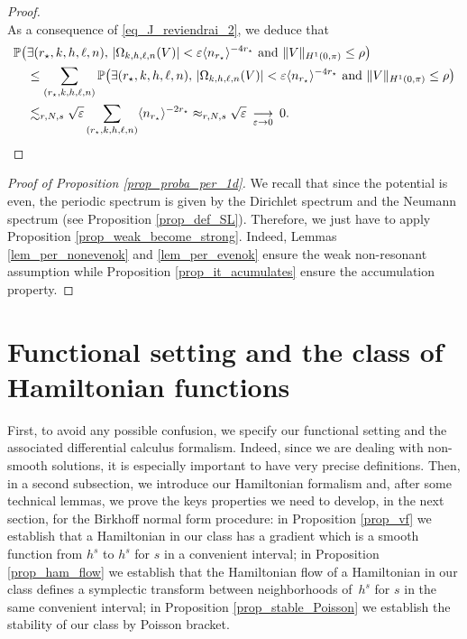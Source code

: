\documentclass[JEP,XML,SOM,Unicode,NoEqCountersInSection,published]{cedram}
\theoremstyle{definition}
\begin{document}
\begin{proof}
\[\]
As a consequence of \eqref{eq_J_reviendrai_2}, we deduce that
\begin{align*}
\mathbb{P}\big(&\exists (r_\star,k,h,\ell,n), \, |\Omega_{k,h,\ell,n}(V)| < \varepsilon \langle n_{r_\star} \rangle^{-4 r_\star} \ \text{and} \ \| V\|_{H^1(0,\pi)} \leq \rho \big) \\ & \leq \sum_{ (r_\star,k,h,\ell,n)} \mathbb{P}\big(\exists (r_\star,k,h,\ell,n), \, |\Omega_{k,h,\ell,n}(V)| < \varepsilon \langle n_{r_\star} \rangle^{-4 r_\star} \ \text{and} \ \| V\|_{H^1(0,\pi)} \leq \rho \big) \\
& \lesssim_{r,N,s} \sqrt{\varepsilon} \sum_{ (r_\star,k,h,\ell,n)} \langle n_{r_\star} \rangle^{-2 r_\star} \approx_{r,N,s} \sqrt{\varepsilon} \ \mathop{\longrightarrow}_{\varepsilon \to 0} \ 0.\qedhere
\end{align*}
\end{proof}

\begin{proof}[Proof of Proposition \ref{prop_proba_per_1d}] We recall that since the potential is even, the periodic spectrum is given by the Dirichlet spectrum and the Neumann spectrum (see Proposition \ref{prop_def_SL}). Therefore, we just have to apply Proposition \ref{prop_weak_become_strong}. Indeed, Lemmas \ref{lem_per_nonevenok} and \ref{lem_per_evenok} ensure the weak non-resonant assumption while Proposition \ref{prop_it_acumulates} ensure the accumulation property.
\end{proof}

\section{Functional setting and the class of Hamiltonian functions}
\label{sec_class_Ham}

First, to avoid any possible confusion, we specify our functional setting and the asso\-ciated differential calculus formalism. Indeed, since we are dealing with non-smooth solutions, it is especially important to have very precise definitions. Then, in a second subsection, we introduce our Hamiltonian formalism and, after some technical lemmas, we prove the keys properties we need to develop, in the next section, for the Birkhoff normal form procedure: in Proposition \ref{prop_vf} we establish that a Hamiltonian in our class has a gradient which is a smooth function from $h^s$ to $h^s$ for $s$ in a convenient interval; in Proposition \ref{prop_ham_flow} we establish that the Hamiltonian flow of a Hamiltonian in our class defines a symplectic transform between neighborhoods of~$h^s$ for $s$ in the same convenient interval; in Proposition \ref{prop_stable_Poisson} we establish the stability of our class by Poisson bracket.
\end{document}
